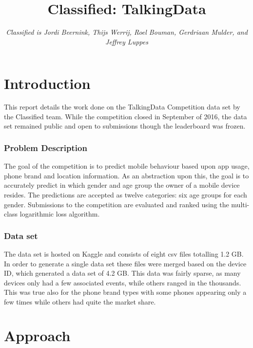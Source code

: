 \documentclass[runningheads,a4paper]{llncs}
\begin{document}
\mainmatter 

\title{Classified: TalkingData}


\author{\textit{Classified is Jordi Beernink, Thijs Werrij, Roel Bouman, Gerdriaan Mulder, and Jeffrey Luppes}}



\tocauthor{{}}

\maketitle
\section{Introduction}
\noindent
This report details the work done on the TalkingData Competition data set by the Classified team. While the competition closed in September of 2016,  the data set remained public and open to submissions though the leaderboard was frozen.

\subsubsection{Problem Description}
The goal of the competition is to predict mobile behaviour based upon app usage, phone brand and location information. As an abstraction upon this, the goal is to accurately predict in which gender and age group the owner of a mobile device resides. The predictions are accepted as twelve categories: six age groups for each gender. Submissions to the competition are evaluated and ranked using the multi-class logarithmic loss algorithm.
\subsubsection{Data set}
The data set is hosted on Kaggle and consists of eight csv files totalling 1.2 GB. In order to generate a single data set these files were merged based on the device ID, which generated a data set of 4.2 GB. This data was fairly sparse, as many devices only had a few associated events, while others ranged in the thousands. This was true also for the phone brand types with some phones appearing only a few times while others had quite the market share. 

\section{Approach}
\end{document}
